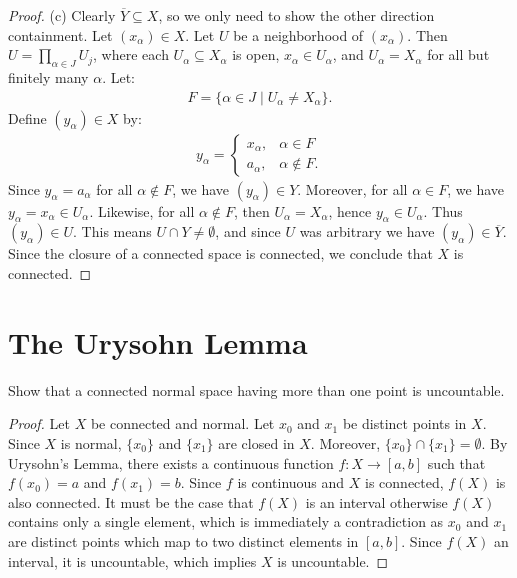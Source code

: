 \documentclass[10pt,twoside,openany]{memoir}
\begin{document}
\begin{proof}
        (c) Clearly $\overline{Y} \subseteq X$, so we only need to show the other direction containment. Let $(x_\alpha) \in X$. Let $U$ be a neighborhood of $(x_\alpha)$. Then $U = \prod_{\alpha \in J}U_j$, where each $U_\alpha \subseteq X_\alpha$ is open, $x_\alpha \in U_\alpha$, and $U_\alpha = X_\alpha$ for all but finitely many $\alpha$. Let:
            \begin{equation*}
            \begin{split}
                F = \{\alpha \in J \mid U_\alpha \neq X_\alpha\}.
            \end{split}
            \end{equation*}
        Define $(y_\alpha) \in X$ by:
            \begin{equation*}
            \begin{split}
                y_\alpha =\begin{cases}
                x_\alpha, & \alpha \in F \\
                a_\alpha, & \alpha \not\in F.
                \end{cases}
            \end{split}
            \end{equation*}
        Since $y_\alpha = a_\alpha$ for all $\alpha \not\in F$, we have $(y_\alpha) \in Y$. Moreover, for all $\alpha \in F$, we have $y_\alpha = x_\alpha \in U_\alpha$. Likewise, for all $\alpha \not\in F$, then $U_\alpha = X_\alpha$, hence $y_\alpha \in U_\alpha$. Thus $(y_\alpha) \in U$. This means $U \cap Y \neq \emptyset$, and since $U$ was arbitrary we have $(y_\alpha) \in \overline{Y}$. Since the closure of a connected space is connected, we conclude that $X$ is connected.
    \end{proof}

\newpage
\chapter{The Urysohn Lemma}
\begin{problem}[manual-num={33.2(a)}]
Show that a connected normal space having more than one point is uncountable.
\end{problem}
\begin{proof}
Let $X$ be connected and normal. Let $x_0$ and $x_1$ be distinct points in $X$. Since $X$ is normal, $\{x_0\}$ and $\{x_1\}$ are closed in $X$. Moreover, $\{x_0\} \cap \{x_1\} = \emptyset$. By Urysohn's Lemma, there exists a continuous function $f:X \rightarrow [a,b]$ such that $f(x_0) = a$ and $f(x_1) = b$. Since $f$ is continuous and $X$ is connected, $f(X)$ is also connected. It must be the case that $f(X)$ is an interval \textemdash otherwise $f(X)$ contains only a single element, which is immediately a contradiction as $x_0$ and $x_1$ are distinct points which map to two distinct elements in $[a,b]$. Since $f(X)$ an interval, it is uncountable, which implies $X$ is uncountable.
\end{proof}
\end{document}
